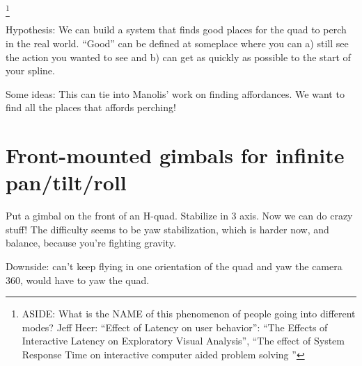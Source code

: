 \footnote{ASIDE: What is the NAME of this phenomenon of people going into different modes? Jeff Heer: ``Effect of Latency on user behavior'': ``The Effects of Interactive Latency on Exploratory Visual Analysis'', ``The effect of System Response Time on interactive computer aided problem solving
''}

Hypothesis: We can build a system that finds good places for the quad to perch in the real world. ``Good'' can be defined at someplace where you can a) still see the action you wanted to see and b) can get as quickly as possible to the start of your spline. 

Some ideas: This can tie into Manolis' work on finding affordances. We want to find all the places that affords perching!

\section{Front-mounted gimbals for infinite pan/tilt/roll}

Put a gimbal on the front of an H-quad. Stabilize in 3 axis. Now we can do crazy stuff! The difficulty seems to be yaw stabilization, which is harder now, and balance, because you're fighting gravity. 

Downside: can't keep flying in one orientation of the quad and yaw the camera 360, would have to yaw the quad.
